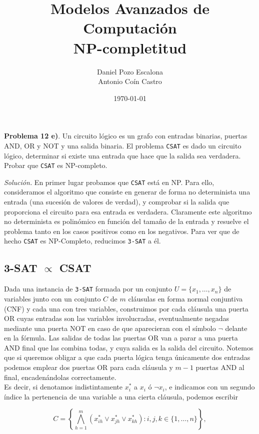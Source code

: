 \documentclass[11pt,a4paper]{article}
\title{Modelos Avanzados de Computación \\ \Large{NP-completitud}}
\author{Daniel Pozo Escalona \\ Antonio Coín Castro}
\date{\today}
\newenvironment{sol}{\begin{adjustwidth}{1em}{}}{\end{adjustwidth}}
\begin{document}
\maketitle

\textbf{Problema 12 e)}. Un circuito lógico es un grafo con entradas binarias, puertas AND, OR y NOT y una salida binaria. El problema \verb|CSAT| es dado un circuito lógico, determinar si existe una entrada
que hace que la salida sea verdadera. Probar que \verb|CSAT| es NP-completo.\\

\begin{sol} \textit{Solución.} En primer lugar probamos que \verb|CSAT| está en NP. Para ello, consideramos el algoritmo que consiste en generar de forma no determinista una entrada (una sucesión de valores de verdad), y comprobar si la salida que proporciona el circuito para esa entrada es verdadera. Claramente este algoritmo no determinista es polinómico en función del tamaño de la entrada y resuelve el problema tanto en los casos positivos como en los negativos. Para ver que de hecho \verb|CSAT| es NP-Completo, reducimos \verb|3-SAT| a él.

\subsection*{3-SAT $\mathbf{\propto}$ CSAT}

Dada una instancia de \verb|3-SAT| formada por un conjunto $U=\{x_1, \dots, x_n\}$ de variables junto con un conjunto $C$ de $m$ cláusulas en forma normal conjuntiva (CNF) y cada una con tres variables, construimos por cada cláusula una puerta OR cuyas entradas son las variables involucradas, eventualmente negadas mediante una puerta NOT en caso de que aparecieran con el símbolo $\lnot$ delante en la fórmula. Las salidas de todas las puertas OR van a parar a una puerta AND final que las combina todas, y cuya salida es la salida del circuito. Notemos que si queremos obligar a que cada puerta lógica tenga únicamente dos entradas podemos emplear dos puertas OR para cada cláusula y $m-1$ puertas AND al final, encadenándolas correctamente.\\

Es decir, si denotamos indistintamente $x^*_i$ a $x_i$ ó $\lnot x_i$, e indicamos con un segundo índice la pertenencia de una variable a una cierta cláusula, podemos escribir

\[
C = \left\{ \bigwedge_{h=1}^m (x^*_{ih} \lor x^*_{jh} \lor x^*_{kh}) : i, j, k \in \{1,\dots,n \} \right\},
\] 


\end{sol}
\end{document}
